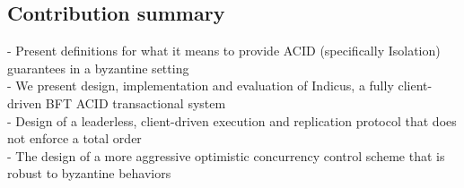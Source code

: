 \subsection{Contribution summary}
 - Present definitions for what it means to provide ACID (specifically Isolation) guarantees in a byzantine setting\\
 - We present design, implementation and evaluation of Indicus, a fully client-driven BFT ACID transactional system \\
 - Design of a leaderless, client-driven execution and replication protocol that does not enforce a total order\\
 - The design of a more aggressive optimistic concurrency control scheme that is robust to byzantine behaviors
 